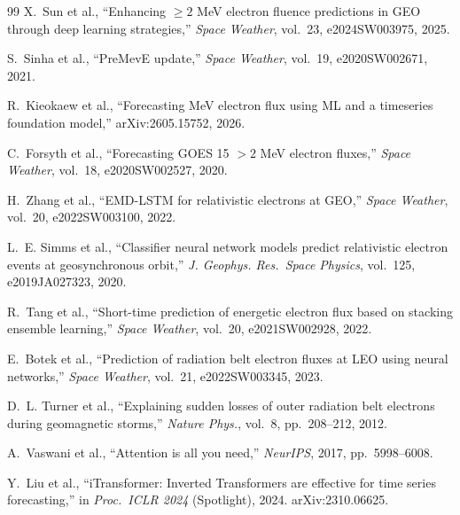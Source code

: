 \documentclass[conference]{IEEEtran}
\begin{document}
\begin{thebibliography}{99}
X.~Sun et al., ``Enhancing \(\ge2\) MeV electron fluence predictions in GEO
through deep learning strategies,'' \emph{Space Weather}, vol.~23,
e2024SW003975, 2025.

S.~Sinha et al., ``PreMevE update,'' \emph{Space Weather}, vol.~19,
e2020SW002671, 2021.

R.~Kieokaew et al., ``Forecasting MeV electron flux using ML and a timeseries
foundation model,'' arXiv:2605.15752, 2026.

C.~Forsyth et al., ``Forecasting GOES 15 \(>2\) MeV electron fluxes,''
\emph{Space Weather}, vol.~18, e2020SW002527, 2020.

H.~Zhang et al., ``EMD-LSTM for relativistic electrons at GEO,''
\emph{Space Weather}, vol.~20, e2022SW003100, 2022.

L.~E. Simms et al., ``Classifier neural network models predict relativistic
electron events at geosynchronous orbit,'' \emph{J. Geophys. Res.\ Space
Physics}, vol.~125, e2019JA027323, 2020.

R.~Tang et al., ``Short-time prediction of energetic electron flux based on
stacking ensemble learning,'' \emph{Space Weather}, vol.~20,
e2021SW002928, 2022.

E.~Botek et al., ``Prediction of radiation belt electron fluxes at LEO using
neural networks,'' \emph{Space Weather}, vol.~21, e2022SW003345, 2023.

D.~L. Turner et al., ``Explaining sudden losses of outer radiation belt
electrons during geomagnetic storms,'' \emph{Nature Phys.}, vol.~8,
pp.~208--212, 2012.

A.~Vaswani et al., ``Attention is all you need,'' \emph{NeurIPS}, 2017,
pp.~5998--6008.

Y.~Liu et al., ``iTransformer: Inverted Transformers are effective for time
series forecasting,'' in \emph{Proc.\ ICLR 2024} (Spotlight), 2024.
arXiv:2310.06625.

\end{thebibliography}
\balance
\end{document}
